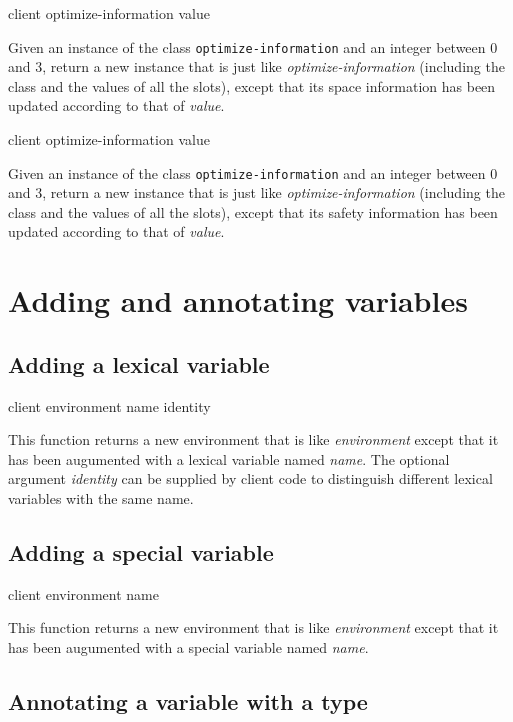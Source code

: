  {client optimize-information value}

Given an instance of the class \texttt{optimize-information} and an
integer between $0$ and $3$, return a new instance that is just like
\textit{optimize-information} (including the class and the values of
all the slots), except that its space information has been updated
according to that of \textit{value}.

 {client optimize-information value}

Given an instance of the class \texttt{optimize-information} and an
integer between $0$ and $3$, return a new instance that is just like
\textit{optimize-information} (including the class and the values of
all the slots), except that its safety information has been updated
according to that of \textit{value}.

\section{Adding and annotating variables}

\subsection{Adding a lexical variable}

{\footnotesize
{} {client environment name \optional identity}
}

This function returns a new environment that is like
\textit{environment} except that it has been augumented with a lexical
variable named \textit{name}.  The optional argument \textit{identity}
can be supplied by client code to distinguish different lexical
variables with the same name.

\subsection{Adding a special variable}

{\footnotesize
{} {client environment name}
}

This function returns a new environment that is like
\textit{environment} except that it has been augumented with a special
variable named \textit{name}.

\subsection{Annotating a variable with a type}
\label{sec-annotating-a-variable-with-a-type}

